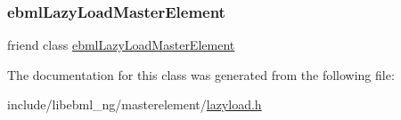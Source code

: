 \subsubsection{\texorpdfstring{ebml\+Lazy\+Load\+Master\+Element}{ebmlLazyLoadMasterElement}}
{\footnotesize\ttfamily friend class \mbox{\hyperlink{classebml_1_1ebmlLazyLoadMasterElement}{ebml\+Lazy\+Load\+Master\+Element}}\hspace{0.3cm}{\ttfamily [friend]}}



The documentation for this class was generated from the following file\+:\begin{DoxyCompactItemize}
\item 
include/libebml\+\_\+ng/masterelement/\mbox{\hyperlink{lazyload_8h}{lazyload.\+h}}\end{DoxyCompactItemize}
